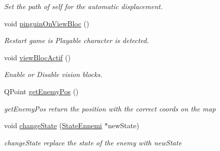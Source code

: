 \begin{DoxyCompactItemize}
\begin{DoxyCompactList}\small\item\em Set the path of self for the automatic displacement. \end{DoxyCompactList}\item 
\hypertarget{class_ennemi_a6811b0a25a92ec210750072b83d1f74e}{}void \hyperlink{class_ennemi_a6811b0a25a92ec210750072b83d1f74e}{pinguin\+On\+View\+Bloc} ()\label{class_ennemi_a6811b0a25a92ec210750072b83d1f74e}

\begin{DoxyCompactList}\small\item\em Restart game is Playable character is detected. \end{DoxyCompactList}\item 
\hypertarget{class_ennemi_ad4861b8a3ad9d4819d3716ac3d0e8501}{}void \hyperlink{class_ennemi_ad4861b8a3ad9d4819d3716ac3d0e8501}{view\+Bloc\+Actif} ()\label{class_ennemi_ad4861b8a3ad9d4819d3716ac3d0e8501}

\begin{DoxyCompactList}\small\item\em Enable or Disable vision blocks. \end{DoxyCompactList}\item 
Q\+Point \hyperlink{class_ennemi_a14529c0dc2ad2edf3b5d174221ffa6ff}{get\+Enemy\+Pos} ()
\begin{DoxyCompactList}\small\item\em get\+Enemy\+Pos return the position with the correct coords on the map \end{DoxyCompactList}\item 
void \hyperlink{class_ennemi_a3d8cf7a7d4b577a46cfdfaa1f37e9ded}{change\+State} (\hyperlink{class_state_ennemi}{State\+Ennemi} $\ast$new\+State)
\begin{DoxyCompactList}\small\item\em change\+State replace the state of the enemy with new\+State \end{DoxyCompactList}\end{DoxyCompactItemize}
